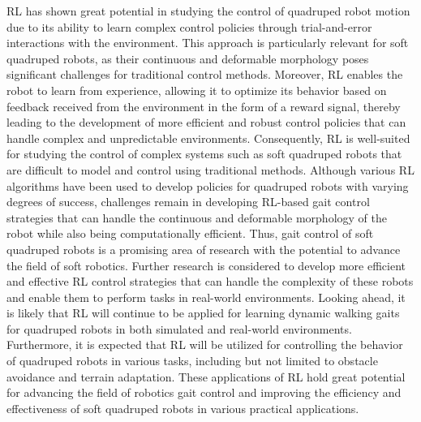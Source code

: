 \ac{RL} has shown great potential in studying the control of quadruped robot motion due to its ability to learn complex control policies through trial-and-error interactions with the environment\cite{rechtTourReinforcementLearning2019}. This approach is particularly relevant for soft quadruped robots, as their continuous and deformable morphology poses significant challenges for traditional control methods\cite{zhangEffectiveSoftRobot2017}. Moreover, \ac{RL} enables the robot to learn from experience, allowing it to optimize its behavior based on feedback received from the environment in the form of a reward signal, thereby leading to the development of more efficient and robust control policies that can handle complex and unpredictable environments\cite{jiLearningbasedControl4D}. Consequently, \ac{RL} is well-suited for studying the control of complex systems such as soft quadruped robots that are difficult to model and control using traditional methods\cite{rechtTourReinforcementLearning2019}. Although various \ac{RL} algorithms have been used to develop policies for quadruped robots with varying degrees of success\cite{cebeOnlineDynamicTrajectory2021,chignoliOnlineTrajectoryOptimization2021,chignoliRapidReliableQuadruped2022}, challenges remain in developing \ac{RL}-based gait control strategies that can handle the continuous and deformable morphology of the robot while also being computationally efficient\cite{wangEfficientLearningRobust2022}. Thus, gait control of soft quadruped robots is a promising area of research with the potential to advance the field of soft robotics. Further research is considered to develop more efficient and effective \ac{RL} control strategies that can handle the complexity of these robots and enable them to perform tasks in real-world environments\cite{annaswamyAdaptiveControlIntersections2023}. Looking ahead, it is likely that \ac{RL} will continue to be applied for learning dynamic walking gaits for quadruped robots in both simulated and real-world environments. Furthermore, it is expected that \ac{RL} will be utilized for controlling the behavior of quadruped robots in various tasks, including but not limited to obstacle avoidance and terrain adaptation. These applications of \ac{RL} hold great potential for advancing the field of robotics gait control and improving the efficiency and effectiveness of soft quadruped robots in various practical applications.

